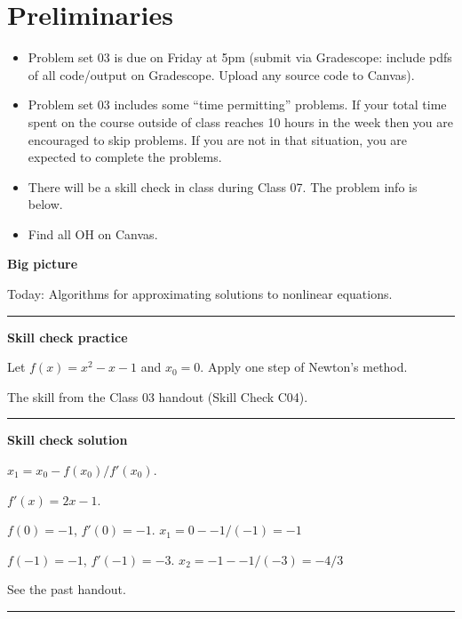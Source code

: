 \documentclass[12pt,letterpaper,noanswers]{exam}
\begin{document}
 \pdfpageheight 11in 
  \pdfpagewidth 8.5in

\noindent 

\section*{Preliminaries}

\begin{itemize}
\itemsep0pt
\item Problem set 03 is due on Friday at 5pm (submit via Gradescope: include pdfs of all code/output on Gradescope.  Upload any source code to Canvas).
\item Problem set 03 includes some ``time permitting'' problems.  If your total time spent on the course outside of class reaches 10 hours in the week then you are encouraged to skip problems.  If you are not in that situation, you are expected to complete the problems.
\item There will be a skill check in class during Class 07.  The problem info is below.
\item Find all OH on Canvas.
\end{itemize}



\noindent\textbf{Big picture}

Today: Algorithms for approximating solutions to nonlinear equations.

\vspace{0.2cm}
\hrule
\vspace{0.2cm}

\noindent \textbf{Skill check practice}
\begin{questions}
\item Let $f(x) = x^2 -x -1$ and $x_0 = 0$.  Apply one step of Newton's method.
\item The skill from the Class 03 handout (Skill Check C04).
\end{questions}


\vspace{0.2cm}
\hrule
\vspace{0.2cm}

\noindent \textbf{Skill check solution}
\begin{questions}
\item $x_1 = x_0 - f(x_0)/f'(x_0)$.  

$f'(x) = 2x - 1$.

$f(0) = -1$, $f'(0) = -1$.  $x_1 = 0 - -1/(-1) = -1$

$f(-1) = -1$, $f'(-1) = -3$.  $x_2 = -1 - -1/(-3) = -4/3$

\item See the past handout.
\end{questions}
\vspace{0.2cm}
\hrule
\vspace{0.2cm}
\end{document}
